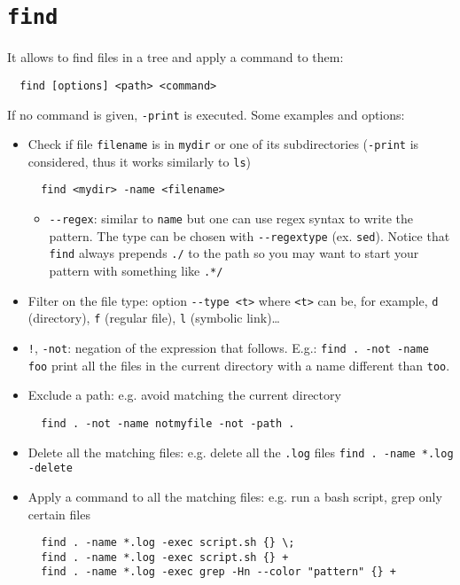\documentclass[a4paper,12pt,%
              final%
              ]{article}
\begin{document}
\section{\texttt{find}}
It allows to find files in a tree and apply a command to them:
\begin{verbatim}
  find [options] <path> <command>
\end{verbatim}
If no command is given, \texttt{-print} is executed. Some examples and options:
\begin{itemize}
  \item Check if file \texttt{filename} is in \texttt{mydir} or one of its subdirectories (\texttt{-print} is considered, thus it works similarly to \texttt{ls})
\begin{verbatim}
  find <mydir> -name <filename>
\end{verbatim}
  \begin{itemize}
    \item \verb|--regex|: similar to \texttt{name} but one can use regex syntax to write the pattern. The type can be chosen with \verb|--regextype| (ex. \texttt{sed}). Notice that \texttt{find} always prepends \verb|./| to the path so you may want to start your pattern with something like \verb|.*/|
  \end{itemize}
  \item Filter on the file type: option \verb|--type <t>| where \texttt{<t>} can be, for example, \texttt{d} (directory), \texttt{f} (regular file), \texttt{l} (symbolic link)\dots
  \item \texttt{!}, \texttt{-not}: negation of the expression that follows. E.g.: \texttt{find . -not -name foo} print all the files in the current directory with a name different than \texttt{too}.
  \item Exclude a path: e.g. avoid matching the current directory
\begin{verbatim}
  find . -not -name notmyfile -not -path .
\end{verbatim}
  \item Delete all the matching files: e.g. delete all the \texttt{.log} files \texttt{find . -name *.log -delete}
  \item Apply a command to all the matching files: e.g. run a bash script, grep only certain files
\begin{verbatim}
  find . -name *.log -exec script.sh {} \;
  find . -name *.log -exec script.sh {} +
  find . -name *.log -exec grep -Hn --color "pattern" {} +
\end{verbatim}

\end{itemize}
\end{document}
